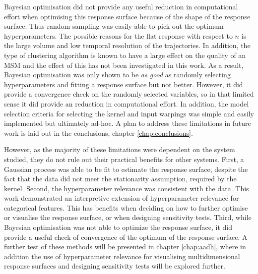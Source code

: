 Bayesian optimisation did not provide any useful reduction in computational effort when optimising this response surface because of the shape of the response surface.  Thus random sampling was easily able to pick out the optimum hyperparameters. The possible reasons for the flat response with respect to $n$ is the large volume and low temporal resolution of the trajectories. In addition, the type of clustering algorithm is known to have a large effect on the quality of an MSM \cite{husicWardClusteringImproves2017a} and the effect of this has not been investigated in this work. As a result, Bayesian optimisation was only shown to be \emph{as good} as randomly selecting hyperparameters and fitting a response surface but not better. However, it did provide a convergence check on the randomly selected variables, so in that limited sense it did provide an reduction in computational effort.  In addition, the model selection criteria for selecting the kernel and input warpings was simple and easily implemented but ultimately ad-hoc. A plan to address these limitations in future work is laid out in the conclusions, chapter \ref{chap:conclusions}. 

However, as the majority of these limitations were dependent on the system studied, they do not rule out their practical benefits for other systems. First, a Gaussian process was able to be fit to estimate the response surface, despite the fact that the data did not meet the  stationarity assumption, required by the kernel. Second, the hyperparameter relevance was consistent with the data. This work demonstrated an interpretive extension of hyperparameter relevance for categorical features. This has benefits when deciding on how to further optimise or visualise the response surface, or when designing sensitivity tests. Third, while Bayesian optimisation was not able to optimize the response surface, it did provide a useful check of convergence of the optimum of the response surface. A further test of these methods will be presented in chapter \ref{chap:aadh}, where in addition the use of hyperparameter relevance for visualising multidimensional response surfaces and designing sensitivity tests will be explored further. 



